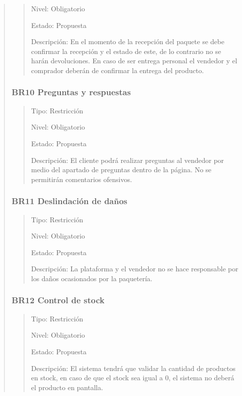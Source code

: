 \documentclass[14pt]{article}
\begin{document}
\begin{quote}
\begin{quote}
                        Nivel: Obligatorio
                        
                        Estado: Propuesta
                        
                        Descripción: En el momento de la recepción del paquete se debe confirmar la recepción y el estado de este, de lo contrario no se harán devoluciones. En caso de ser entrega personal el vendedor y el comprador  deberán de confirmar la entrega del producto.
                    \end{quote}
                \subsubsection{BR10 Preguntas y respuestas}\label{BR10 Preguntas y respuestas}
                    \begin{quote}
                        Tipo: Restricción
                        
                        Nivel: Obligatorio
                        
                        Estado: Propuesta
                        
                        Descripción: El cliente podrá realizar preguntas al vendedor por medio del apartado de preguntas dentro de la página. No se permitirán comentarios ofensivos.
                    \end{quote}
                \subsubsection{BR11 Deslindación de daños}\label{BR11 Deslindación de daños}
                    \begin{quote}
                        Tipo: Restricción
                        
                        Nivel: Obligatorio
                        
                        Estado: Propuesta
                        
                        Descripción: La plataforma y el vendedor no se hace responsable por los daños ocasionados por la paquetería.
                    \end{quote}
                \subsubsection{BR12  Control de stock}\label{BR12  Control de stock}
                    \begin{quote}
                        Tipo: Restricción
    
                        Nivel: Obligatorio
    
                        Estado: Propuesta
    
                        Descripción: El sistema tendrá que validar la cantidad de productos en stock, en caso de que el stock sea igual a 0, el sistema no deberá el producto en pantalla.
                    \end{quote}
            \end{quote}
    \newpage        
\end{document}
